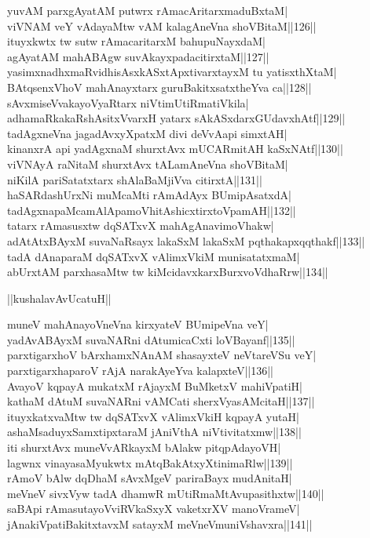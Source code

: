 \documentclass{article}
\begin{document}
yuvAM parxgAyatAM putwrx rAmacAritarxmaduBxtaM|\\
viVNAM veY vAdayaMtw vAM kalagAneVna shoVBitaM||126||\\
ituyxkwtx tw sutw rAmacaritarxM bahupuNayxdaM|\\
agAyatAM mahABAgw suvAkayxpadacitirxtaM||127||\\
yasimxnadhxmaRvidhisAsxkASxtApxtivarxtayxM tu yatisxthXtaM|\\
BAtqsenxVhoV mahAnayxtarx guruBakitxsatxtheYva ca||128||\\
sAvxmiseVvakayoVyaRtarx niVtimUtiRmatiVkila|\\
adhamaRkakaRshAsitxVvarxH yatarx sAkASxdarxGUdavxhAtf||129||\\
tadAgxneVna jagadAvxyXpatxM divi deVvAapi simxtAH|\\
kinanxrA api yadAgxnaM shurxtAvx mUCARmitAH kaSxNAtf||130||\\
viVNAyA raNitaM shurxtAvx tALamAneVna shoVBitaM|\\
niKilA pariSatatxtarx shAlaBaMjiVva citirxtA||131||\\
haSARdashUrxNi muMcaMti rAmAdAyx BUmipAsatxdA|\\
tadAgxnapaMcamAlApamoVhitAshicxtirxtoVpamAH||132||\\
tatarx rAmasusxtw dqSATxvX mahAgAnavimoVhakw|\\
adAtAtxBAyxM suvaNaRsayx lakaSxM lakaSxM pqthakapxqqthakf||133||\\
tadA dAnaparaM dqSATxvX vAlimxVkiM munisatatxmaM|\\
abUrxtAM parxhasaMtw tw kiMcidavxkarxBurxvoVdhaRrw||134||\\

\begin{center}
||kushalavAvUcatuH||
\end{center}

muneV mahAnayoVneVna kirxyateV BUmipeVna veY|\\
yadAvABAyxM suvaNARni dAtumicaCxti loVBayanf||135||\\
parxtigarxhoV bArxhamxNAnAM shasayxteV neVtareVSu veY|\\
parxtigarxhaparoV rAjA narakAyeYva kalapxteV||136||\\
AvayoV kqpayA mukatxM rAjayxM BuMketxV mahiVpatiH|\\
kathaM dAtuM suvaNARni vAMCati sherxVyasAMcitaH||137||\\
ituyxkatxvaMtw tw dqSATxvX vAlimxVkiH kqpayA yutaH|\\
ashaMsaduyxSamxtipxtaraM jAniVthA niVtivitatxmw||138||\\
iti shurxtAvx muneVvARkayxM bAlakw pitqpAdayoVH|\\
lagwnx vinayasaMyukwtx mAtqBakAtxyXtinimaRlw||139||\\
rAmoV bAlw dqDhaM sAvxMgeV pariraBayx mudAnitaH|\\
meVneV sivxVyw tadA dhamwR mUtiRmaMtAvupasithxtw||140||\\
saBApi rAmasutayoVviRVkaSxyX vaketxrXV manoVrameV|\\
jAnakiVpatiBakitxtavxM satayxM meVneVmuniVshavxra||141||\\
\end{document}
